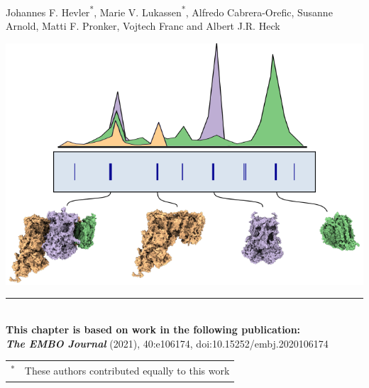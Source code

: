  \label{ch-2}
\vspace*{0.25cm}

\footnotesize Johannes F. Hevler\textsuperscript{*}, Marie V. Lukassen\textsuperscript{*}, Alfredo Cabrera-Orefic, Susanne Arnold, Matti F. Pronker, Vojtech Franc and Albert J.R. Heck
%
\begin{center}
    \vspace{3cm}
    \includegraphics[]{Chapter.2/Figures/chapter_cover.png}
    \vspace{0.25cm}
\end{center}
%
\begin{flushleft}
    \vspace*{\fill}
    \rule{\textwidth}{1pt}\\[0cm]
    \textbf{This chapter is based on work in the following publication:}\\
    \footnotesize
    \textbf{\emph{The EMBO Journal}} (2021), 40:e106174, doi:10.15252/embj.2020106174\\
    \footnotesize
    \vspace{0.3cm}
    \begin{tabular}[t]{p{}p{}}
        \textsuperscript{*} & These authors contributed equally to this work \\
    \end{tabular}
\end{flushleft}
%
